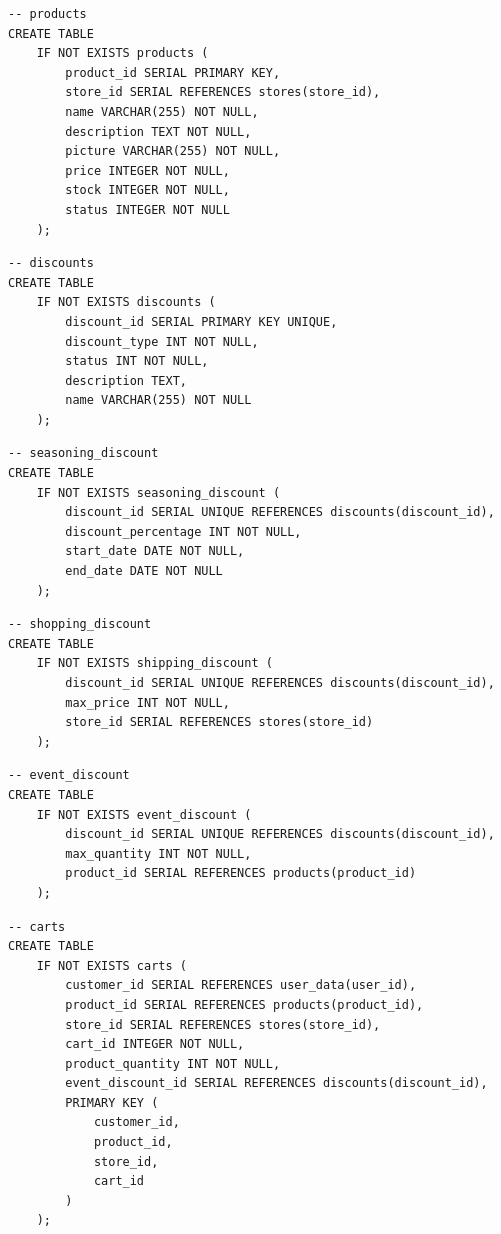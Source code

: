 \documentclass[a4paper, 12pt]{article}
\begin{document}
\begin{lstlisting}
-- products
CREATE TABLE
    IF NOT EXISTS products (
        product_id SERIAL PRIMARY KEY,
        store_id SERIAL REFERENCES stores(store_id),
        name VARCHAR(255) NOT NULL,
        description TEXT NOT NULL,
        picture VARCHAR(255) NOT NULL,
        price INTEGER NOT NULL,
        stock INTEGER NOT NULL,
        status INTEGER NOT NULL
    );
\end{lstlisting}

\begin{lstlisting}
-- discounts
CREATE TABLE
    IF NOT EXISTS discounts (
        discount_id SERIAL PRIMARY KEY UNIQUE,
        discount_type INT NOT NULL,
        status INT NOT NULL,
        description TEXT,
        name VARCHAR(255) NOT NULL
    );
\end{lstlisting}

\begin{lstlisting}
-- seasoning_discount
CREATE TABLE
    IF NOT EXISTS seasoning_discount (
        discount_id SERIAL UNIQUE REFERENCES discounts(discount_id),
        discount_percentage INT NOT NULL,
        start_date DATE NOT NULL,
        end_date DATE NOT NULL
    );
\end{lstlisting}

\begin{lstlisting}
-- shopping_discount
CREATE TABLE
    IF NOT EXISTS shipping_discount (
        discount_id SERIAL UNIQUE REFERENCES discounts(discount_id),
        max_price INT NOT NULL,
        store_id SERIAL REFERENCES stores(store_id)
    );
\end{lstlisting}

\begin{lstlisting}
-- event_discount
CREATE TABLE
    IF NOT EXISTS event_discount (
        discount_id SERIAL UNIQUE REFERENCES discounts(discount_id),
        max_quantity INT NOT NULL,
        product_id SERIAL REFERENCES products(product_id)
    );
\end{lstlisting}

\begin{lstlisting}
-- carts
CREATE TABLE
    IF NOT EXISTS carts (
        customer_id SERIAL REFERENCES user_data(user_id),
        product_id SERIAL REFERENCES products(product_id),
        store_id SERIAL REFERENCES stores(store_id),
        cart_id INTEGER NOT NULL,
        product_quantity INT NOT NULL,
        event_discount_id SERIAL REFERENCES discounts(discount_id),
        PRIMARY KEY (
            customer_id,
            product_id,
            store_id,
            cart_id
        )
    );
\end{lstlisting}
\end{document}
